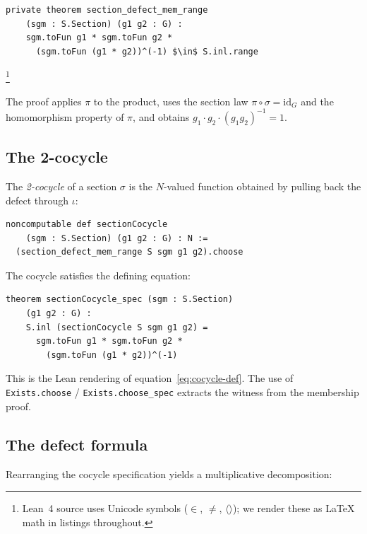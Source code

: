 \documentclass[11pt]{article}
\newcommand{\id}{\mathrm{id}}
\newcommand{\lean}[1]{\texttt{#1}}
\begin{document}
\begin{lstlisting}[mathescape=true]
private theorem section_defect_mem_range
    (sgm : S.Section) (g1 g2 : G) :
    sgm.toFun g1 * sgm.toFun g2 *
      (sgm.toFun (g1 * g2))^(-1) $\in$ S.inl.range
\end{lstlisting}%
\footnote{Lean~4 source uses Unicode symbols ($\in$, $\ne$, $\langle\rangle$);
  we render these as \LaTeX{} math in listings throughout.}

\noindent
The proof applies $\pi$ to the product, uses the section law $\pi \circ \sigma =
\id_G$ and the homomorphism property of $\pi$, and obtains $g_1 \cdot g_2 \cdot
(g_1 g_2)^{-1} = 1$.

\subsection{The 2-cocycle}\label{sec:cocycle-def}

\begin{definition}\label{def:cocycle}
The \emph{2-cocycle} of a section $\sigma$ is the $N$-valued function obtained by
pulling back the defect through $\iota$:
\begin{lstlisting}
noncomputable def sectionCocycle
    (sgm : S.Section) (g1 g2 : G) : N :=
  (section_defect_mem_range S sgm g1 g2).choose
\end{lstlisting}
\end{definition}

\begin{theorem}\label{thm:cocycle-spec}
The cocycle satisfies the defining equation:
\begin{lstlisting}
theorem sectionCocycle_spec (sgm : S.Section)
    (g1 g2 : G) :
    S.inl (sectionCocycle S sgm g1 g2) =
      sgm.toFun g1 * sgm.toFun g2 *
        (sgm.toFun (g1 * g2))^(-1)
\end{lstlisting}
\end{theorem}

\noindent
This is the Lean rendering of equation~\eqref{eq:cocycle-def}.  The use of
\lean{Exists.choose} / \lean{Exists.choose\_spec} extracts the witness from the
membership proof.

\subsection{The defect formula}\label{sec:defect-formula}

Rearranging the cocycle specification yields a multiplicative decomposition:
\end{document}
